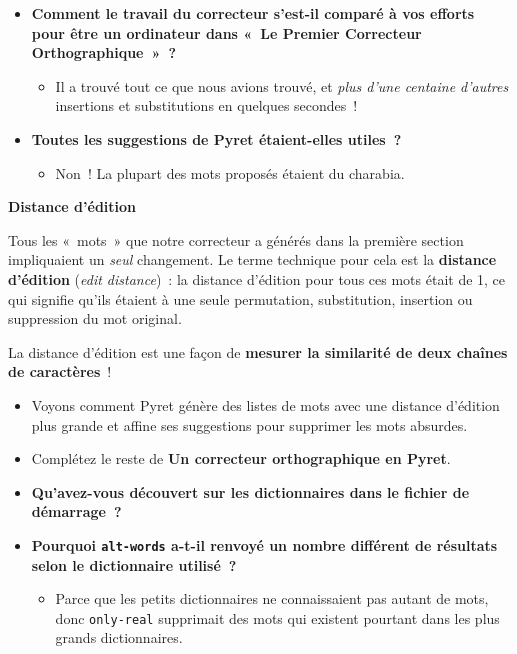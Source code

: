 \documentclass[12pt,a4paper]{article}
\begin{document}
\begin{activitybox}
  \begin{itemize}
    \item \textbf{Comment le travail du correcteur s'est-il comparé à vos efforts pour être un ordinateur dans «~Le Premier Correcteur Orthographique~»~?}
    \begin{itemize}
      \item Il a trouvé tout ce que nous avions trouvé, et \emph{plus d'une centaine d'autres} insertions et substitutions en quelques secondes~!
    \end{itemize}
    \item \textbf{Toutes les suggestions de Pyret étaient-elles utiles~?}
    \begin{itemize}
      \item Non~! La plupart des mots proposés étaient du charabia.
    \end{itemize}
  \end{itemize}
\end{activitybox}

\begin{keypointbox}
  \textbf{Distance d'édition}

  Tous les «~mots~» que notre correcteur a générés dans la première section impliquaient un \emph{seul} changement. Le terme technique pour cela est la \textbf{distance d'édition} (\emph{edit distance})~: la distance d'édition pour tous ces mots était de 1, ce qui signifie qu'ils étaient à une seule permutation, substitution, insertion ou suppression du mot original.

  La distance d'édition est une façon de \textbf{mesurer la similarité de deux chaînes de caractères}~!
\end{keypointbox}

\begin{activitybox}
  \begin{itemize}
    \item Voyons comment Pyret génère des listes de mots avec une distance d'édition plus grande et affine ses suggestions pour supprimer les mots absurdes.
    \item Complétez le reste de \textbf{Un correcteur orthographique en Pyret}.
  \end{itemize}
\end{activitybox}

\begin{thinkbox}
  \begin{itemize}
    \item \textbf{Qu'avez-vous découvert sur les dictionnaires dans le fichier de démarrage~?}
    \item \textbf{Pourquoi \texttt{alt-words} a-t-il renvoyé un nombre différent de résultats selon le dictionnaire utilisé~?}
    \begin{itemize}
      \item Parce que les petits dictionnaires ne connaissaient pas autant de mots, donc \texttt{only-real} supprimait des mots qui existent pourtant dans les plus grands dictionnaires.
    \end{itemize}
  \end{itemize}
\end{thinkbox}
\end{document}
